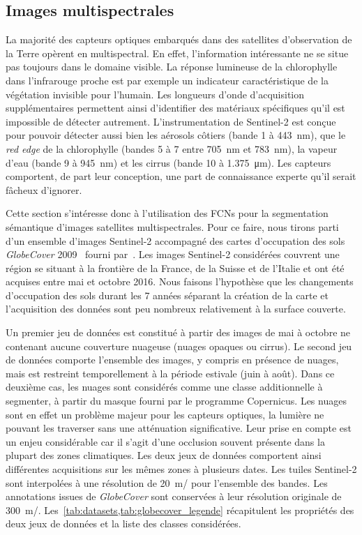 \subsection{Images multispectrales}
\label{sec:multispectral}

La majorité des capteurs optiques embarqués dans des satellites d'observation de la Terre opèrent en multispectral. En effet, l'information intéressante ne se situe pas toujours dans le domaine visible. La réponse lumineuse de la chlorophylle dans l'infrarouge proche est par exemple un indicateur caractéristique de la végétation invisible pour l'humain. Les longueurs d'onde d'acquisition supplémentaires permettent ainsi d'identifier des matériaux spécifiques qu'il est impossible de détecter autrement. L'instrumentation de \gls{Sentinel}-2 est conçue pour pouvoir détecter aussi bien les aérosols côtiers (bande 1 à \SI{443}{\nano\meter}), que le \emph{red edge} de la chlorophylle (bandes 5 à 7 entre \SI{705}{\nano\meter} et \SI{783}{\nano\meter}), la vapeur d'eau (bande 9 à \SI{945}{\nano\meter}) et les cirrus (bande 10 à \SI{1,375}{\micro\meter}). Les capteurs comportent, de part leur conception, une part de connaissance experte qu'il serait fâcheux d'ignorer.

Cette section s'intéresse donc à l'utilisation des \glspl{FCN} pour la segmentation sémantique d'images satellites multispectrales. Pour ce faire, nous tirons parti d'un ensemble d'images Sentinel-2 accompagné des cartes d'occupation des sols \emph{GlobeCover} 2009~\cite{arino_global_2012} fourni par~\citet{ben_hamida_deep_2017}. Les images Sentinel-2 considérées couvrent une région se situant à la frontière de la France, de la Suisse et de l'Italie et ont été acquises entre mai et octobre 2016. Nous faisons l'hypothèse que les changements d'occupation des sols durant les 7 années séparant la création de la carte et l'acquisition des données sont peu nombreux relativement à la surface couverte.

Un premier jeu de données est constitué à partir des images de mai à octobre ne contenant aucune couverture nuageuse (nuages opaques ou cirrus). Le second jeu de données comporte l'ensemble des images, y compris en présence de nuages, mais est restreint temporellement à la période estivale (juin à août). Dans ce deuxième cas, les nuages sont considérés comme une classe additionnelle à segmenter, à partir du masque fourni par le programme Copernicus. Les nuages sont en effet un problème majeur pour les capteurs optiques, la lumière ne pouvant les traverser sans une atténuation significative. Leur prise en compte est un enjeu considérable car il s'agit d'une occlusion souvent présente dans la plupart des zones climatiques. Les deux jeux de données comportent ainsi différentes acquisitions sur les mêmes zones à plusieurs dates. Les tuiles Sentinel-2 sont interpolées à une résolution de \SI{20}{\meter/\px} pour l'ensemble des bandes. Les annotations issues de \emph{GlobeCover} sont conservées à leur résolution originale de \SI{300}{\meter/\px}. Les~\cref{tab:datasets,tab:globecover_legende} récapitulent les propriétés des deux jeux de données et la liste des classes considérées.

